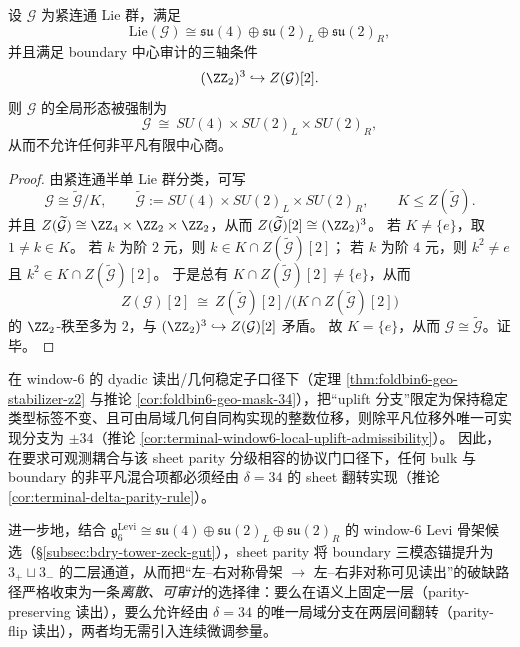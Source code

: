 \begin{theorem}\label{thm:window6-patisalam-global-form-rigidity}
设 \(\mathcal G\) 为紧连通 Lie 群，满足
\[
\mathrm{Lie}(\mathcal G)\cong \mathfrak{su}(4)\oplus \mathfrak{su}(2)_L\oplus \mathfrak{su}(2)_R,
\]
并且满足 boundary 中心审计的三轴条件
\[
(\ZZ_2)^3\hookrightarrow Z(\mathcal G)[2].
\]
则 \(\mathcal G\) 的全局形态被强制为
\[
\mathcal G\ \cong\ SU(4)\times SU(2)_L\times SU(2)_R,
\]
从而不允许任何非平凡有限中心商。
\end{theorem}
\begin{proof}
由紧连通半单 Lie 群分类，可写
\[
\mathcal G\cong \widetilde{\mathcal G}/K,\qquad
\widetilde{\mathcal G}:=SU(4)\times SU(2)_L\times SU(2)_R,\qquad
K\le Z(\widetilde{\mathcal G}).
\]
并且
\(
Z(\widetilde{\mathcal G})\cong \ZZ_4\times \ZZ_2\times \ZZ_2
\)，从而 \(Z(\widetilde{\mathcal G})[2]\cong (\ZZ_2)^3\)。
若 \(K\neq\{e\}\)，取 \(1\neq k\in K\)。
若 \(k\) 为阶 \(2\) 元，则 \(k\in K\cap Z(\widetilde{\mathcal G})[2]\)；
若 \(k\) 为阶 \(4\) 元，则 \(k^2\neq e\) 且 \(k^2\in K\cap Z(\widetilde{\mathcal G})[2]\)。
于是总有 \(K\cap Z(\widetilde{\mathcal G})[2]\neq\{e\}\)，从而
\[
Z(\mathcal G)[2]\ \cong\ Z(\widetilde{\mathcal G})[2]/\bigl(K\cap Z(\widetilde{\mathcal G})[2]\bigr)
\]
的 \(\ZZ_2\)-秩至多为 \(2\)，与 \((\ZZ_2)^3\hookrightarrow Z(\mathcal G)[2]\) 矛盾。
故 \(K=\{e\}\)，从而 \(\mathcal G\cong \widetilde{\mathcal G}\)。证毕。
\end{proof}

\begin{proposition}[\texorpdfstring{$\delta=34$}{δ=34} 的几何可实现性与离散破缺通道]\label{prop:bdry-sheet-parity-discrete-breaking}
在 window-\(6\) 的 dyadic 读出/几何稳定子口径下（定理 \ref{thm:foldbin6-geo-stabilizer-z2} 与推论 \ref{cor:foldbin6-geo-mask-34}），把“uplift 分支”限定为保持稳定类型标签不变、且可由局域几何自同构实现的整数位移，则除平凡位移外唯一可实现分支为 \(\pm 34\)（推论 \ref{cor:terminal-window6-local-uplift-admissibility}）。
因此，在要求可观测耦合与该 sheet parity 分级相容的协议门口径下，任何 bulk 与 boundary 的非平凡混合项都必须经由 \(\delta=34\) 的 sheet 翻转实现（推论 \ref{cor:terminal-delta-parity-rule}）。
\par
进一步地，结合 \(\mathfrak g^{\mathrm{Levi}}_6\cong \mathfrak{su}(4)\oplus\mathfrak{su}(2)_L\oplus\mathfrak{su}(2)_R\) 的 window-\(6\) Levi 骨架候选（\S\ref{subsec:bdry-tower-zeck-gut}），sheet parity 将 boundary 三模态锚提升为 \(3_+\sqcup 3_-\) 的二层通道，从而把“左--右对称骨架 \(\to\) 左--右非对称可见读出”的破缺路径严格收束为一条\emph{离散、可审计}的选择律：要么在语义上固定一层（parity-preserving 读出），要么允许经由 \(\delta=34\) 的唯一局域分支在两层间翻转（parity-flip 读出），两者均无需引入连续微调参量。
\end{proposition}

